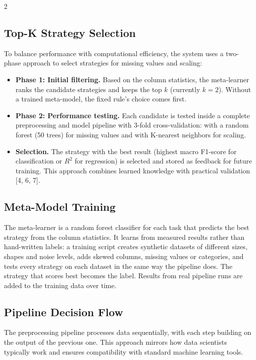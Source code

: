 \documentclass[11pt,a4paper]{article}
\begin{document}
\begin{multicols}{2}
\subsection{Top-K Strategy Selection}

To balance performance with computational efficiency, the system uses a two-phase approach to select strategies for missing values and scaling:
\begin{itemize}
    \item \textbf{Phase 1: Initial filtering.} Based on the column statistics, the meta-learner ranks the candidate strategies and keeps the top $k$ (currently $k=2$). Without a trained meta-model, the fixed rule's choice comes first.
    \item \textbf{Phase 2: Performance testing.} Each candidate is tested inside a complete preprocessing and model pipeline with 3-fold cross-validation: with a random forest (50 trees) for missing values and with K-nearest neighbors for scaling.
    \item \textbf{Selection.} The strategy with the best result (highest macro F1-score for classification or $R^2$ for regression) is selected and stored as feedback for future training. This approach combines learned knowledge with practical validation [4, 6, 7].
\end{itemize}


\subsection{Meta-Model Training}

The meta-learner is a random forest classifier for each task that predicts the best strategy from the column statistics. It learns from measured results rather than hand-written labels: a training script creates synthetic datasets of different sizes, shapes and noise levels, adds skewed columns, missing values or categories, and tests every strategy on each dataset in the same way the pipeline does. The strategy that scores best becomes the label. Results from real pipeline runs are added to the training data over time.


\subsection{Pipeline Decision Flow}

The preprocessing pipeline processes data sequentially, with each step building on the output of the previous one. This approach mirrors how data scientists typically work and ensures compatibility with standard machine learning tools.


\end{multicols}
\end{document}
